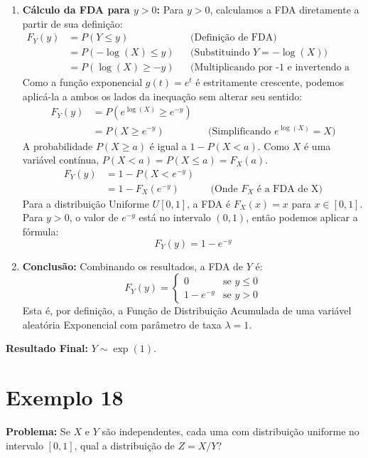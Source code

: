 \documentclass{article}
\begin{document}
\begin{enumerate}
		\item \textbf{Cálculo da FDA para $y > 0$:}
		Para $y > 0$, calculamos a FDA diretamente a partir de sua definição:
		\begin{align*}
			F_Y(y) &= P(Y \le y) && \text{(Definição de FDA)} \\
			&= P(-\log(X) \le y) && \text{(Substituindo } Y = -\log(X)\text{)} \\
			&= P(\log(X) \ge -y) && \text{(Multiplicando por -1 e invertendo a desigualdade)}
		\end{align*}
		Como a função exponencial $g(t) = e^t$ é estritamente crescente, podemos aplicá-la a ambos os lados da inequação sem alterar seu sentido:
		\begin{align*}
			F_Y(y) &= P(e^{\log(X)} \ge e^{-y}) \\
			&= P(X \ge e^{-y}) && \text{(Simplificando } e^{\log(X)} = X\text{)}
		\end{align*}
		A probabilidade $P(X \ge a)$ é igual a $1 - P(X < a)$. Como $X$ é uma variável contínua, $P(X<a) = P(X \le a) = F_X(a)$.
		\begin{align*}
			F_Y(y) &= 1 - P(X < e^{-y}) \\
			&= 1 - F_X(e^{-y}) && \text{(Onde } F_X \text{ é a FDA de X)}
		\end{align*}
		Para a distribuição Uniforme $U[0, 1]$, a FDA é $F_X(x) = x$ para $x \in [0, 1]$. Para $y > 0$, o valor de $e^{-y}$ está no intervalo $(0, 1)$, então podemos aplicar a fórmula:
		\[
		F_Y(y) = 1 - e^{-y}
		\]
		
		\item \textbf{Conclusão:}
		Combinando os resultados, a FDA de $Y$ é:
		\[
		F_Y(y) = 
		\begin{cases} 
			0 & \text{se } y \le 0 \\
			1 - e^{-y} & \text{se } y > 0 
		\end{cases}
		\]
		Esta é, por definição, a Função de Distribuição Acumulada de uma variável aleatória Exponencial com parâmetro de taxa $\lambda = 1$.
	\end{enumerate}
	\textbf{Resultado Final:} $Y \sim \exp(1)$.
	
	\hrulefill
	
	\section*{Exemplo 18}
	
	\textbf{Problema:} Se $X$ e $Y$ são independentes, cada uma com distribuição uniforme no intervalo $[0, 1]$, qual a distribuição de $Z = X/Y$?
	
\end{document}
